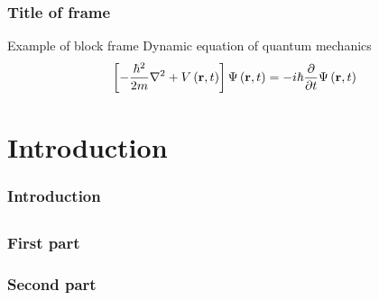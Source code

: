 \documentclass[handout]{beamer}
\begin{document}
\begin{frame}
\begin{center}
{\titlepage}
\end{center}
\end{frame}
\begin{frame}
\frametitle{Title of frame}
\begin{block}
{Example of block frame}
Dynamic equation of quantum mechanics
\begin{align*}
\left[ -\frac{\hbar^2}{2m}\nabla^2 + V\left( \mathbf{r}, t \right) \right]\Psi\left( \mathbf{r}, t \right) = -i\hbar\frac{\partial}{\partial t}\Psi\left( \mathbf{r}, t \right)
\end{align*}
\end{block}
\end{frame}
\section*{Introduction}
\begin{frame}
\frametitle{Introduction}
\end{frame}
\subsection*{}
\begin{frame}
\frametitle{First part}
\end{frame}
\begin{frame}
\frametitle{Second part}
\end{frame}
\end{document}
